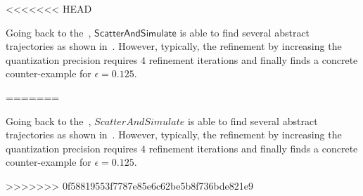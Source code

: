 <<<<<<< HEAD
%
\begin{example}

    Going back to the~, $\mathsf{ScatterAndSimulate}$ is able to
    find several abstract trajectories as shown
    in~. However, typically, the refinement by
    increasing the quantization precision requires $4$ refinement
    iterations and finally finds a concrete counter-example for
    $\epsilon=0.125$.
\end{example}
=======
\begin{example}

Going back to the~, $ScatterAndSimulate$ is able to find
    several abstract trajectories as shown in~.
    However, typically, the refinement by increasing the quantization
    precision requires $4$ refinement iterations and finally finds a
    concrete counter-example for $\epsilon=0.125$.

\end{example}


>>>>>>> 0f58819553f7787e85e6c62be5b8f736bde821e9
